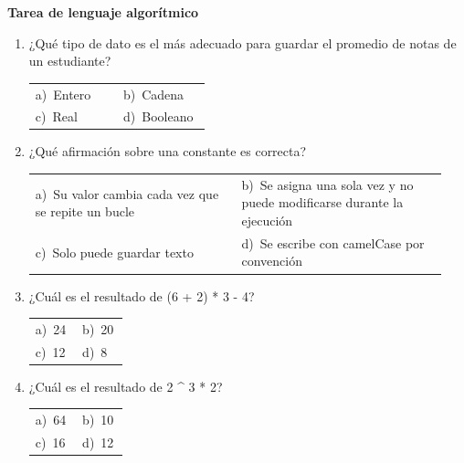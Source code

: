 \documentclass[11pt,a4paper]{article}
\begin{document}
{\Large\bfseries Tarea de lenguaje algorítmico}
\vspace{12pt}
\begin{enumerate}[label=\textbf{\arabic*.},leftmargin=*,itemsep=11pt,topsep=0pt]
\item \begin{minipage}[t]{\linewidth}
¿Qué tipo de dato es el más adecuado para guardar el promedio de notas de un estudiante?

\vspace{4pt}
\begin{tabular}{@{}p{0.47\linewidth}p{0.47\linewidth}@{}}
a)~Entero & b)~Cadena \\
c)~Real & d)~Booleano \\
\end{tabular}
\end{minipage}

\item \begin{minipage}[t]{\linewidth}
¿Qué afirmación sobre una constante es correcta?

\vspace{4pt}
\begin{tabular}{@{}p{0.47\linewidth}p{0.47\linewidth}@{}}
a)~Su valor cambia cada vez que se repite un bucle & b)~Se asigna una sola vez y no puede modificarse durante la ejecución \\
c)~Solo puede guardar texto & d)~Se escribe con camelCase por convención \\
\end{tabular}
\end{minipage}

\item \begin{minipage}[t]{\linewidth}
¿Cuál es el resultado de (6 + 2) * 3 - 4?

\vspace{4pt}
\begin{tabular}{@{}p{0.47\linewidth}p{0.47\linewidth}@{}}
a)~24 & b)~20 \\
c)~12 & d)~8 \\
\end{tabular}
\end{minipage}

\item \begin{minipage}[t]{\linewidth}
¿Cuál es el resultado de 2 \textasciicircum{} 3 * 2?

\vspace{4pt}
\begin{tabular}{@{}p{0.47\linewidth}p{0.47\linewidth}@{}}
a)~64 & b)~10 \\
c)~16 & d)~12 \\
\end{tabular}
\end{minipage}


\end{enumerate}
\end{document}
